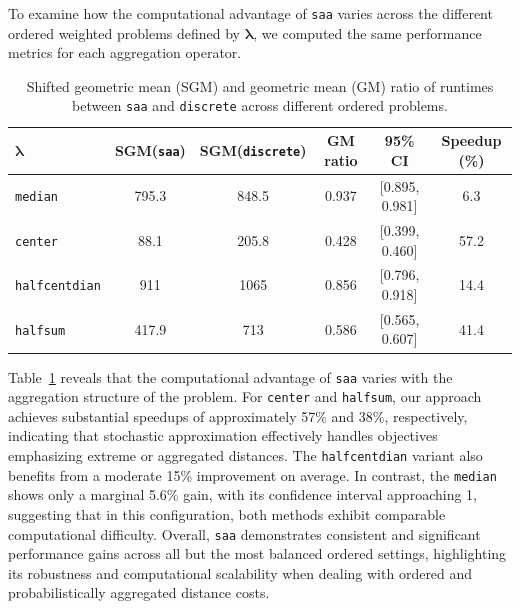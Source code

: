 \documentclass[letter,11pt, reqno]{amsart}
\renewcommand{\;}{\quad}
\theoremstyle{thmstyleone}%
\theoremstyle{thmstyletwo}%
\theoremstyle{thmstylethree}%
\begin{document}
To examine how the computational advantage of \texttt{saa} varies across the different ordered weighted problems defined by $\bm \lambda$, we computed the same performance metrics for each aggregation operator.
\begin{table}[ht]
\centering
\renewcommand{\arraystretch}{0.9}
\setlength{\tabcolsep}{3pt}
\begin{tabular}{l c c c c c}
\toprule
$\bm \lambda$ & \textbf{SGM(\texttt{saa})} & \textbf{SGM(\texttt{discrete})}& \textbf{GM ratio} & \textbf{95\% CI} & \textbf{Speedup (\%)} \\
\midrule
\texttt{median} & 795.3 & 848.5 & 0.937 & [0.895, 0.981] & 6.3\\
\texttt{center} & 88.1 & 205.8 & 0.428 & [0.399, 0.460] & 57.2\\
\texttt{halfcentdian} & 911 & 1065 & 0.856 & [0.796, 0.918] & 14.4\\
\texttt{halfsum} & 417.9 & 713 & 0.586 & [0.565, 0.607] & 41.4\\
\bottomrule
\end{tabular}
\caption{Shifted geometric mean (SGM) and geometric mean (GM) ratio of runtimes between \texttt{saa} and \texttt{discrete} across different ordered problems. }
\label{tab:performance-omp}
\end{table}
Table~\ref{tab:performance-omp} reveals that the computational advantage of \texttt{saa} varies with the aggregation structure of the problem. 
For \texttt{center} and \texttt{halfsum}, our approach  achieves substantial speedups of approximately 57\% and 38\%, respectively, 
indicating that stochastic approximation effectively handles objectives emphasizing extreme or aggregated distances. 
The \texttt{halfcentdian} variant also benefits from a moderate 15\% improvement on average. 
In contrast, the \texttt{median} shows only a marginal 5.6\% gain, with its confidence interval approaching 1, 
suggesting that in this configuration, both methods exhibit comparable computational difficulty. 
Overall, \texttt{saa} demonstrates consistent and significant performance gains across all but the most balanced ordered settings, 
highlighting its robustness and computational scalability when dealing with ordered and probabilistically aggregated distance costs.
\end{document}
